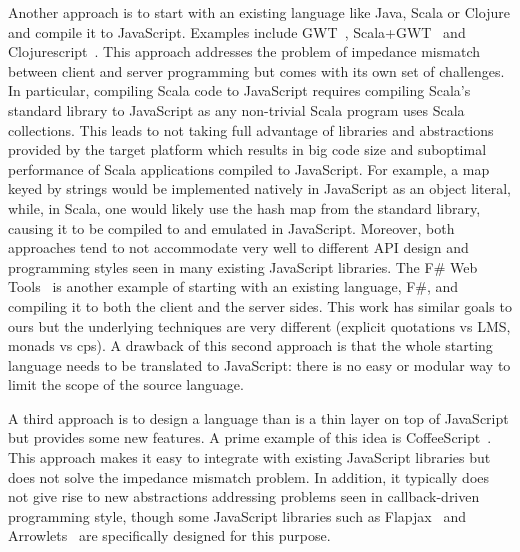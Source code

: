 \documentclass[runningheads,a4paper]{llncs}
\begin{document}
Another approach is to start with an existing language like Java, Scala or Clojure and compile it to JavaScript. Examples include GWT~\cite{gwt}, Scala+GWT~\cite{scala-gwt} and Clojurescript~\cite{clojurescript}. This approach addresses the problem of impedance mismatch between client and server programming but comes with its own set of challenges. In particular, compiling Scala code to JavaScript requires compiling Scala's standard library to JavaScript as any non-trivial Scala program uses Scala collections. This leads to not taking full advantage of libraries and abstractions provided by the target platform which results in big code size and suboptimal performance of Scala applications compiled to JavaScript. For example, a map keyed by strings would be implemented natively in JavaScript as an object literal, while, in Scala, one would likely use the hash map from the standard library, causing it to be compiled to and emulated in JavaScript. Moreover, both approaches tend to not accommodate very well to different API design and programming styles seen in many existing JavaScript libraries. The F\# Web Tools~\cite{tomasp-fsharp} is another example of starting with an existing language, F\#, and compiling it to both the client and the server sides. This work has similar goals to ours but the underlying techniques are very different (explicit quotations vs LMS, monads vs cps). A drawback of this second approach is that the whole starting language needs to be translated to JavaScript: there is no easy or modular way to limit the scope of the source language.

A third approach is to design a language than is a thin layer on top of JavaScript but provides some new features. A prime example of this idea is CoffeeScript~\cite{coffeescript}. This approach makes it easy to integrate with existing JavaScript libraries but does not solve the impedance mismatch problem. In addition, it typically does not give rise to new abstractions addressing problems seen in callback-driven programming style, though some JavaScript libraries such as Flapjax~\cite{flapjax} and Arrowlets~\cite{arrowlets} are specifically designed for this purpose.
\end{document}

